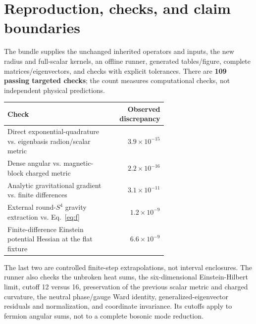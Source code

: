 \section{Reproduction, checks, and claim boundaries}

The bundle supplies the unchanged inherited operators and inputs, the new radius and full-scalar kernels, an offline runner, generated tables/figure, complete matrices/eigenvectors, and checks with explicit tolerances. There are \textbf{109 passing targeted checks}; the count measures computational checks, not independent physical predictions.

\begin{center}
\small
\begin{tabular}{p{0.64\linewidth}r}
\toprule Check & Observed discrepancy\\\midrule
Direct exponential-quadrature vs. eigenbasis radion/scalar metric & $3.9\times10^{-15}$\\
Dense angular vs. magnetic-block charged metric & $2.2\times10^{-16}$\\
Analytic gravitational gradient vs. finite differences & $3.1\times10^{-11}$\\
External round-$S^4$ gravity extraction vs. Eq.~\eqref{eq:f} & $1.2\times10^{-9}$\\
Finite-difference Einstein potential Hessian at the flat fixture & $6.6\times10^{-9}$\\
\bottomrule
\end{tabular}
\end{center}
The last two are controlled finite-step extrapolations, not interval enclosures. The runner also checks the unbroken heat sums, the six-dimensional Einstein-Hilbert limit, cutoff 12 versus 16, preservation of the previous scalar metric and charged curvature, the neutral phase/gauge Ward identity, generalized-eigenvector residuals and normalization, and coordinate invariance. Its cutoffs apply to fermion angular sums, not to a complete bosonic mode reduction.

